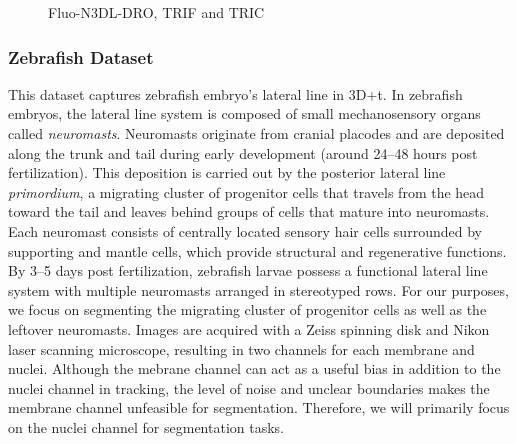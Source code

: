 \begin{figure}[!ht]
    \centering
    \caption{Fluo-N3DL-DRO, TRIF and TRIC}
    \label{fig:slicing}
\end{figure}





\subsubsection{Zebrafish Dataset}

This dataset captures zebrafish embryo's lateral line in 3D+t. In zebrafish embryos, the lateral line system is composed of small mechanosensory organs called \textit{neuromasts}. Neuromasts originate from cranial placodes and are deposited along the trunk and tail during early development (around 24--48 hours post fertilization). This deposition is carried out by the posterior lateral line \textit{primordium}, a migrating cluster of progenitor cells that travels from the head toward the tail and leaves behind groups of cells that mature into neuromasts. Each neuromast consists of centrally located sensory hair cells surrounded by supporting and mantle cells, which provide structural and regenerative functions. By 3--5 days post fertilization, zebrafish larvae possess a functional lateral line system with multiple neuromasts arranged in stereotyped rows. For our purposes, we focus on segmenting the migrating cluster of progenitor cells as well as the leftover neuromasts. Images are acquired with a Zeiss spinning disk and Nikon laser scanning microscope, resulting in two channels for each membrane and nuclei. Although the mebrane channel can act as a useful bias in addition to the nuclei channel in tracking, the level of noise and unclear boundaries makes the membrane channel unfeasible for segmentation. Therefore, we will primarily focus on the nuclei channel for segmentation tasks.

